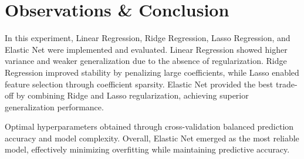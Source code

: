 \documentclass[11pt]{article}
\begin{document}
\section{Observations \& Conclusion}

In this experiment, Linear Regression, Ridge Regression, Lasso Regression, and Elastic Net were implemented and evaluated. Linear Regression showed higher variance and weaker generalization due to the absence of regularization. Ridge Regression improved stability by penalizing large coefficients, while Lasso enabled feature selection through coefficient sparsity. Elastic Net provided the best trade-off by combining Ridge and Lasso regularization, achieving superior generalization performance.

Optimal hyperparameters obtained through cross-validation balanced prediction accuracy and model complexity. Overall, Elastic Net emerged as the most reliable model, effectively minimizing overfitting while maintaining predictive accuracy.
\end{document}
